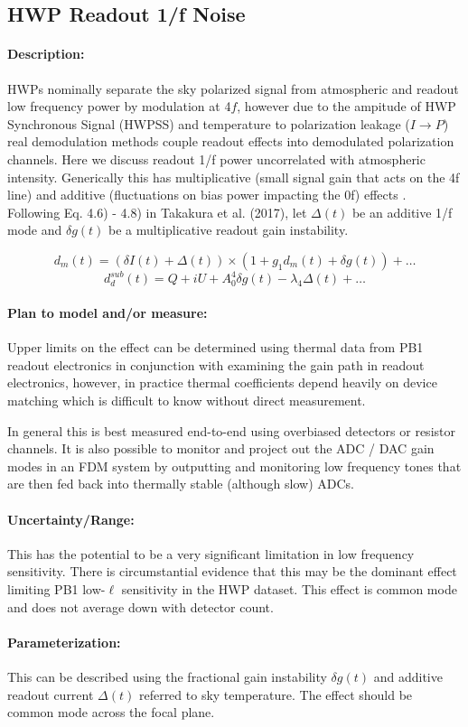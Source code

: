 
\subsection{HWP Readout 1/f Noise}


\paragraph{Description:}
HWPs nominally separate the sky polarized signal from atmospheric and readout low frequency power by modulation at 4$f$, however due to the ampitude of HWP Synchronous Signal (HWPSS) and temperature to polarization leakage ($I \rightarrow P$) real demodulation methods couple readout effects into demodulated polarization channels. 
Here we discuss readout 1/f power uncorrelated with atmospheric intensity. Generically this has multiplicative (small signal gain that acts on the 4f line) and additive (fluctuations on bias power impacting the 0f) effects . Following Eq. 4.6) - 4.8) in Takakura et al. (2017), let $\Delta(t)$ be an additive 1/f mode and $\delta g(t)$ be a multiplicative readout gain instability.

$$
d_{m}(t) = (\delta I (t) + \Delta (t)) \times (1 + g_{1}d_{m}(t) + \delta g(t)) + …
$$
$$
d_{d}^{sub}(t) = Q + iU + A_{0}^{4} \delta g(t) - \lambda_{4} \Delta (t) + …
$$

\paragraph{Plan to model and/or measure:}
Upper limits on the effect can be determined using thermal data from PB1 readout electronics in conjunction with examining the gain path in readout electronics, however, in practice thermal coefficients depend heavily on device matching which is difficult to know without direct measurement.

In general this is best measured end-to-end using overbiased detectors or resistor channels. It is also possible to monitor and project out the ADC / DAC gain modes in an FDM system by outputting and monitoring low frequency tones that are then fed back into thermally stable (although slow) ADCs.

\paragraph{Uncertainty/Range:}

This has the potential to be a very significant limitation in low frequency sensitivity. There is circumstantial evidence that this may be the dominant effect limiting PB1 low-$\ell$ sensitivity in the HWP dataset. This effect is common mode and does not average down with detector count.

\paragraph{Parameterization:}

This can be described using the fractional gain instability $\delta g(t)$ and additive readout current $\Delta (t)$ referred to sky temperature. The effect should be common mode across the focal plane.
